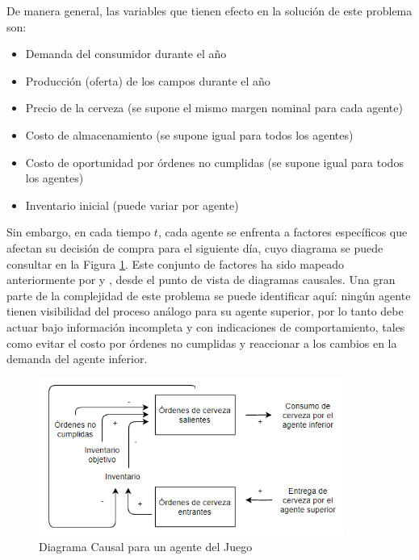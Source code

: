
De manera general, las variables que tienen efecto en la soluci\'on de este problema son:

\begin{itemize}
    \item Demanda del consumidor durante el a\~no
    \item Producci\'on (oferta) de los campos durante el a\~no
    \item Precio de la cerveza (se supone el mismo margen nominal para cada agente)
    \item Costo de almacenamiento (se supone igual para todos los agentes)
    \item Costo de oportunidad por \'ordenes no cumplidas (se supone igual para todos los agentes)
    \item Inventario inicial (puede variar por agente)
\end{itemize}

Sin embargo, en cada tiempo $t$, cada agente se enfrenta a factores espec\'ificos que afectan su decisi\'on de compra para el siguiente d\'ia, cuyo diagrama se puede consultar en la Figura \ref{causal}. Este conjunto de factores ha sido mapeado anteriormente por \citet{Duggan} y \citet{Grasl}, desde el punto de vista de diagramas causales. Una gran parte de la complejidad de este problema se puede identificar aqu\'i: ning\'un agente tienen visibilidad del proceso an\'alogo para su agente superior, por lo tanto debe actuar bajo informaci\'on incompleta y con indicaciones de comportamiento, tales como evitar el costo por \'ordenes no cumplidas y reaccionar a los cambios en la demanda del agente inferior.

\begin{figure}[ht]
\caption{Diagrama Causal para un agente del Juego}
\label{causal}
\includegraphics[width=10cm]{tesis_tex/figs/beer_distribution_game_causal.PNG}
\centering
\end{figure}

